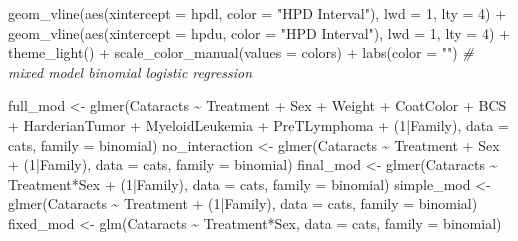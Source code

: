 \documentclass[12pt]{article}
\newenvironment{Shaded}{\begin{snugshade}}{\end{snugshade}}
\newcommand{\AttributeTok}[1]{\textcolor[rgb]{0.77,0.63,0.00}{#1}}
\newcommand{\CommentTok}[1]{\textcolor[rgb]{0.56,0.35,0.01}{\textit{#1}}}
\newcommand{\DecValTok}[1]{\textcolor[rgb]{0.00,0.00,0.81}{#1}}
\newcommand{\FunctionTok}[1]{\textcolor[rgb]{0.00,0.00,0.00}{#1}}
\newcommand{\NormalTok}[1]{#1}
\newcommand{\OtherTok}[1]{\textcolor[rgb]{0.56,0.35,0.01}{#1}}
\newcommand{\SpecialCharTok}[1]{\textcolor[rgb]{0.00,0.00,0.00}{#1}}
\newcommand{\StringTok}[1]{\textcolor[rgb]{0.31,0.60,0.02}{#1}}
\begin{document}
\begin{Shaded}
\begin{Highlighting}[]
  \FunctionTok{geom\_vline}\NormalTok{(}\FunctionTok{aes}\NormalTok{(}\AttributeTok{xintercept =}\NormalTok{ hpdl, }\AttributeTok{color =} \StringTok{"HPD Interval"}\NormalTok{), }\AttributeTok{lwd =} \DecValTok{1}\NormalTok{, }\AttributeTok{lty =} \DecValTok{4}\NormalTok{) }\SpecialCharTok{+}
  \FunctionTok{geom\_vline}\NormalTok{(}\FunctionTok{aes}\NormalTok{(}\AttributeTok{xintercept =}\NormalTok{ hpdu, }\AttributeTok{color =} \StringTok{"HPD Interval"}\NormalTok{), }\AttributeTok{lwd =} \DecValTok{1}\NormalTok{, }\AttributeTok{lty =} \DecValTok{4}\NormalTok{) }\SpecialCharTok{+}
  \FunctionTok{theme\_light}\NormalTok{() }\SpecialCharTok{+}
  \FunctionTok{scale\_color\_manual}\NormalTok{(}\AttributeTok{values =}\NormalTok{ colors) }\SpecialCharTok{+}
  \FunctionTok{labs}\NormalTok{(}\AttributeTok{color =} \StringTok{""}\NormalTok{)}
\CommentTok{\# mixed model binomial logistic regression }

\NormalTok{full\_mod }\OtherTok{\textless{}{-}} \FunctionTok{glmer}\NormalTok{(Cataracts }\SpecialCharTok{\textasciitilde{}}\NormalTok{ Treatment }\SpecialCharTok{+}\NormalTok{ Sex }\SpecialCharTok{+}\NormalTok{ Weight }\SpecialCharTok{+}\NormalTok{ CoatColor }\SpecialCharTok{+}\NormalTok{ BCS }\SpecialCharTok{+}\NormalTok{ HarderianTumor }\SpecialCharTok{+}
\NormalTok{                    MyeloidLeukemia }\SpecialCharTok{+}\NormalTok{ PreTLymphoma }\SpecialCharTok{+}\NormalTok{ (}\DecValTok{1}\SpecialCharTok{|}\NormalTok{Family), }\AttributeTok{data =}\NormalTok{ cats, }\AttributeTok{family =}\NormalTok{ binomial)}
\NormalTok{no\_interaction }\OtherTok{\textless{}{-}} \FunctionTok{glmer}\NormalTok{(Cataracts }\SpecialCharTok{\textasciitilde{}}\NormalTok{ Treatment }\SpecialCharTok{+}\NormalTok{ Sex }\SpecialCharTok{+}\NormalTok{ (}\DecValTok{1}\SpecialCharTok{|}\NormalTok{Family), }\AttributeTok{data =}\NormalTok{ cats, }\AttributeTok{family =}\NormalTok{ binomial)}
\NormalTok{final\_mod }\OtherTok{\textless{}{-}} \FunctionTok{glmer}\NormalTok{(Cataracts }\SpecialCharTok{\textasciitilde{}}\NormalTok{ Treatment}\SpecialCharTok{*}\NormalTok{Sex }\SpecialCharTok{+}\NormalTok{ (}\DecValTok{1}\SpecialCharTok{|}\NormalTok{Family), }\AttributeTok{data =}\NormalTok{ cats, }\AttributeTok{family =}\NormalTok{ binomial)}
\NormalTok{simple\_mod }\OtherTok{\textless{}{-}} \FunctionTok{glmer}\NormalTok{(Cataracts }\SpecialCharTok{\textasciitilde{}}\NormalTok{ Treatment }\SpecialCharTok{+}\NormalTok{ (}\DecValTok{1}\SpecialCharTok{|}\NormalTok{Family), }\AttributeTok{data =}\NormalTok{ cats, }\AttributeTok{family =}\NormalTok{ binomial)}
\NormalTok{fixed\_mod }\OtherTok{\textless{}{-}} \FunctionTok{glm}\NormalTok{(Cataracts }\SpecialCharTok{\textasciitilde{}}\NormalTok{ Treatment}\SpecialCharTok{*}\NormalTok{Sex, }\AttributeTok{data =}\NormalTok{ cats, }\AttributeTok{family =}\NormalTok{ binomial)}


\end{Highlighting}
\end{Shaded}
\end{document}
